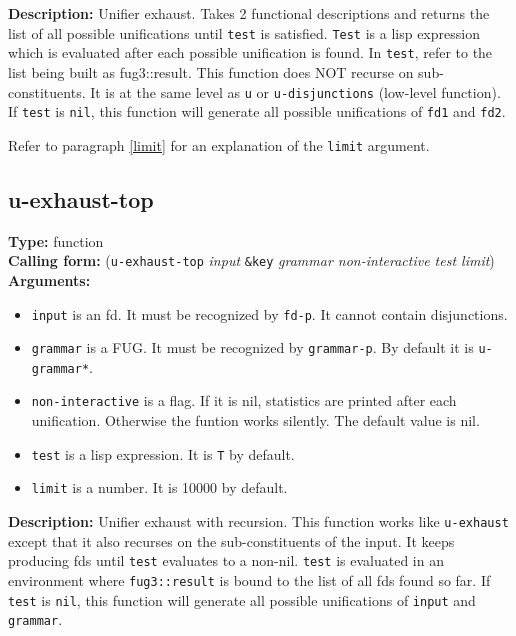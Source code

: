 \documentclass[10pt,a4paper]{report}
\begin{document}
{\bf Description:} Unifier exhaust. Takes 2 functional descriptions and
returns the list of all possible unifications until {\tt test} is satisfied.
{\tt Test} is a lisp expression which is evaluated after each possible
unification is found.  In {\tt test}, refer to the list being built as
fug3::result. This function does NOT recurse on sub-constituents. It is at
the same level as {\tt u} or {\tt u-disjunctions} (low-level function). 
If {\tt test} is {\tt nil}, this function will generate all possible
unifications of {\tt fd1} and {\tt fd2}.  

Refer to paragraph \ref{limit} for an explanation of the {\tt limit} argument.



\subsection{u-exhaust-top}

{\bf Type:} function
\\{\bf Calling form:} ({\tt u-exhaust-top} {\em input} {\tt \&key} {\em grammar
non-interactive test limit})
\\{\bf Arguments:} 
\begin{itemize}
\item {\tt input} is an fd. It must be recognized by {\tt fd-p}. It cannot contain
disjunctions. 

\item {\tt grammar} is a FUG.  It must be recognized by {\tt grammar-p}.  By default
it is {\tt *u-grammar*}.

\item {\tt non-interactive} is a flag.  If it is nil, statistics are printed after
each unification.  Otherwise the funtion works silently.  The default value
is nil.

\item {\tt test} is a lisp expression.  It is {\tt T} by default.

\item {\tt limit} is a number.  It is 10000 by default.
\end{itemize}
{\bf Description:} Unifier exhaust with recursion. This function works like
{\tt u-exhaust} except that it also recurses on the sub-constituents of the
input.  It keeps producing fds until {\tt test} evaluates to a non-nil.
{\tt test} is evaluated in an environment where {\tt fug3::result} is bound to
the list of all fds found so far.
If {\tt test} is {\tt nil}, this function will generate all possible
unifications of {\tt input} and {\tt grammar}.  
\end{document}
